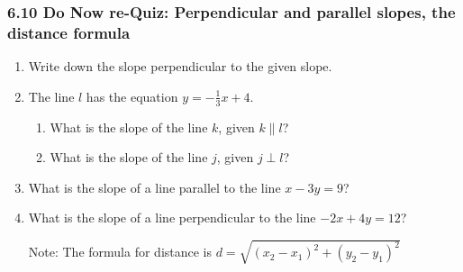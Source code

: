 \documentclass[12pt, twoside]{article}
\begin{document}
\subsubsection*{6.10 Do Now re-Quiz: Perpendicular and parallel slopes, the distance formula}
  \begin{enumerate}

  \item Write down the slope perpendicular to the given slope.
  \begin{enumerate}
  \end{enumerate} \vspace{1cm}

  
  \item The line $l$ has the equation $y=-\frac{1}{3} x+4$.
  \begin{enumerate}
    \item What is the slope of the line $k$, given $k \parallel l$?
    \vspace{1.5cm}
    \item What is the slope of the line $j$, given $j \perp l$?
    \vspace{1.5cm}
  \end{enumerate}

  \item What is the slope of a line parallel to the line $x-3y=9$?  \vspace{4cm}
  \item What is the slope of a line perpendicular to the line $-2x+4y=12$?  
 
\newpage
    Note: The formula for distance is $\displaystyle d=\sqrt{(x_2-x_1)^2+(y_2-y_1)^2}$


\end{enumerate}
\end{document}
